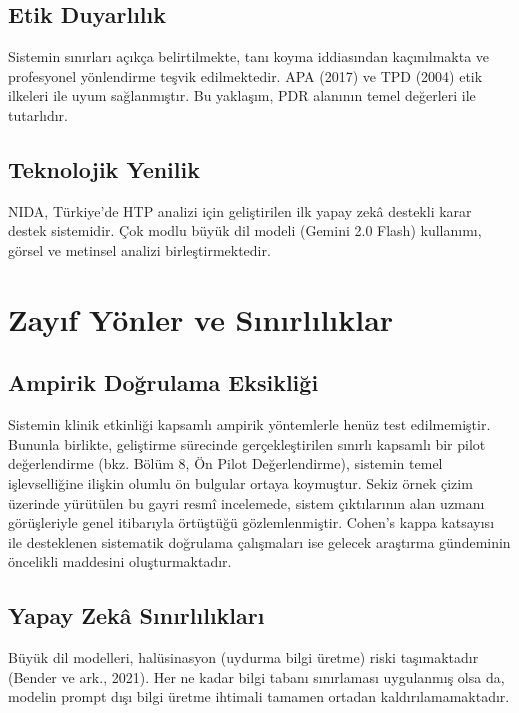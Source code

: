 \subsection{Etik Duyarlılık}

Sistemin sınırları açıkça belirtilmekte, tanı koyma iddiasından kaçınılmakta ve profesyonel yönlendirme teşvik edilmektedir. APA (2017) ve TPD (2004) etik ilkeleri ile uyum sağlanmıştır. Bu yaklaşım, PDR alanının temel değerleri ile tutarlıdır.

\subsection{Teknolojik Yenilik}

NIDA, Türkiye'de HTP analizi için geliştirilen ilk yapay zekâ destekli karar destek sistemidir. Çok modlu büyük dil modeli (Gemini 2.0 Flash) kullanımı, görsel ve metinsel analizi birleştirmektedir.

\section{Zayıf Yönler ve Sınırlılıklar}

\subsection{Ampirik Doğrulama Eksikliği}

Sistemin klinik etkinliği kapsamlı ampirik yöntemlerle henüz test edilmemiştir. Bununla birlikte, geliştirme sürecinde gerçekleştirilen sınırlı kapsamlı bir pilot değerlendirme (bkz. Bölüm 8, Ön Pilot Değerlendirme), sistemin temel işlevselliğine ilişkin olumlu ön bulgular ortaya koymuştur. Sekiz örnek çizim üzerinde yürütülen bu gayri resmî incelemede, sistem çıktılarının alan uzmanı görüşleriyle genel itibarıyla örtüştüğü gözlemlenmiştir. Cohen's kappa katsayısı ile desteklenen sistematik doğrulama çalışmaları ise gelecek araştırma gündeminin öncelikli maddesini oluşturmaktadır.

\subsection{Yapay Zekâ Sınırlılıkları}

Büyük dil modelleri, halüsinasyon (uydurma bilgi üretme) riski taşımaktadır (Bender ve ark., 2021). Her ne kadar bilgi tabanı sınırlaması uygulanmış olsa da, modelin prompt dışı bilgi üretme ihtimali tamamen ortadan kaldırılamamaktadır.

